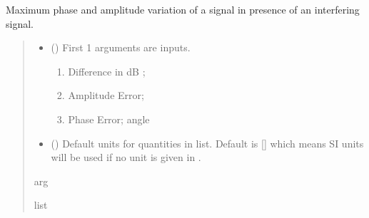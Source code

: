\documentclass[letterpaper,10pt,english]{sphinxmanual}
\begin{document}
\begin{fulllineitems}
\label{\detokenize{components:components.Interference_Phase_Amp_Error}}
\pysigstartsignatures
{}
\pysigstopsignatures
\sphinxAtStartPar
Maximum phase and amplitude variation of a signal in presence of an interfering signal.
\begin{quote}\begin{description}
\begin{itemize}
\item {} 
\sphinxAtStartPar
{} () \textendash{} 
\sphinxAtStartPar
First 1 arguments are inputs.
\begin{enumerate}
%
\item {} 
\sphinxAtStartPar
Difference in dB ;

\item {} 
\sphinxAtStartPar
Amplitude Error;

\item {} 
\sphinxAtStartPar
Phase Error; angle

\end{enumerate}


\item {} 
\sphinxAtStartPar
{} (\sphinxstyleliteralemphasis{\sphinxupquote{, }}) \textendash{} Default units for quantities in  list. Default is {[}{]} which means SI units will be used if no unit is given in .

\end{itemize}

\sphinxAtStartPar
arg

\sphinxAtStartPar
list

\end{description}\end{quote}

\end{fulllineitems}

\end{document}
